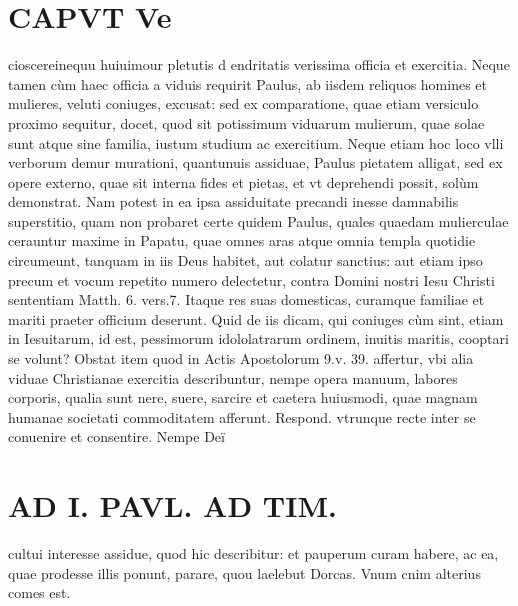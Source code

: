 \documentclass{article}
\begin{document}
\begin{pages}
\section*{CAPVT  Ve }
\marginpar{[ p.261 ]}\pstart cioscereinequu huiuimour pletutis d endritatis verissima officia et exercitia.  \pend\pstart Neque tamen cùm haec officia a viduis requirit Paulus, ab iisdem reliquos homines et mulieres, veluti coniuges, excusat: sed ex comparatione, quae etiam versiculo proximo sequitur, docet, quod sit potissimum viduarum mulierum, quae solae sunt atque sine familia, iustum studium ac exercitium. Neque etiam hoc loco vlli verborum demur murationi, quantunuis assiduae, Paulus pietatem alligat, sed ex opere externo, quae sit interna fides et pietas, et vt deprehendi possit, solùm demonstrat. Nam potest in ea ipsa assiduitate precandi inesse damnabilis superstitio, quam non probaret certe quidem Paulus, quales quaedam mulierculae cerauntur maxime in Papatu, quae omnes aras atque omnia templa quotidie circumeunt, tanquam in iis Deus habitet, aut colatur sanctius: aut etiam ipso precum et vocum repetito numero delectetur, contra Domini nostri Iesu Christi sententiam Matth. 6. vers.7. Itaque res suas domesticas, curamque familiae et mariti praeter officium deserunt. Quid de iis dicam, qui coniuges cùm sint, etiam in Iesuitarum, id est, pessimorum idololatrarum ordinem, inuitis maritis, cooptari se volunt?  \pend\pstart Obstat item quod in Actis Apostolorum 9.v. 39. affertur, vbi alia viduae Christianae exercitia describuntur, nempe opera manuum, labores corporis, qualia sunt nere, suere, sarcire et caetera huiusmodi, quae magnam humanae societati commoditatem afferunt. Respond. vtrunque recte inter se conuenire et consentire. Nempe Deï  \pend
\section*{AD I. PAVL. AD TIM. }
\marginpar{[ p.262 ]}\pstart cultui interesse assidue, quod hic describitur: et pauperum curam habere, ac ea, quae prodesse illis ponunt, parare, quou laelebut Dorcas. Vnum cnim alterius comes est.  \pend
{}
{}

\end{pages}
\end{document}
